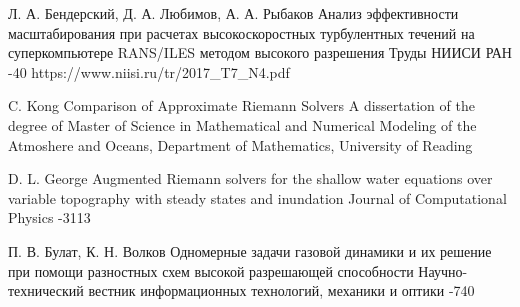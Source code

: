 \documentclass[utf8]{psta}
\begin{document}
\begin{thebibliography}{30}
\by Л. А. Бендерский, Д. А. Любимов, А. А. Рыбаков
\paper Анализ эффективности масштабирования при расчетах высокоскоростных турбулентных течений на суперкомпьютере RANS/ILES методом высокого разрешения
\jour Труды НИИСИ РАН
-40
\URL https://www.niisi.ru/tr/2017_T7_N4.pdf

\by C. Kong
\thesis Comparison of Approximate Riemann Solvers
\thesisinfo A dissertation of the degree of Master of Science in Mathematical and Numerical Modeling of the Atmoshere and Oceans, Department of Mathematics, University of Reading

\by D. L. George
\paper Augmented Riemann solvers for the shallow water equations over variable topography with steady states and inundation
\jour Journal of Computational Physics
-3113

\by П. В. Булат, К. Н. Волков
\paper Одномерные задачи газовой динамики и их решение при помощи разностных схем высокой разрешающей способности
\jour Научно-технический вестник информационных технологий, механики и оптики
-740

\end{thebibliography}
\end{document}
